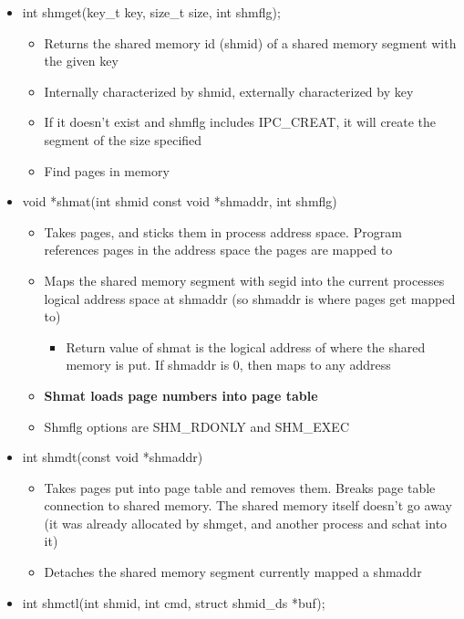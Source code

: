 \begin{itemize}
    \item int shmget(key\_t key, size\_t size, int shmflg);
    \begin{itemize}
        \item Returns the shared memory id (shmid) of a shared memory segment with the given key
        \item Internally characterized by shmid, externally characterized by key
        \item If it doesn't exist and shmflg includes IPC\_CREAT, it will create the segment of the size specified
        \item Find pages in memory
    \end{itemize}
    \item void *shmat(int shmid const void *shmaddr, int shmflg)
    \begin{itemize}
        \item Takes pages, and sticks them in process address space. Program references pages in the address space the pages are mapped to
        \item Maps the shared memory segment with segid into the current processes logical address space at shmaddr (so shmaddr is where pages get mapped to)
        \begin{itemize}
            \item Return value of shmat is the logical address of where the shared memory is put. If shmaddr is 0, then maps to any address
        \end{itemize}
        \item \textbf{Shmat loads page numbers into page table}
        \item Shmflg options are SHM\_RDONLY and SHM\_EXEC
    \end{itemize}
    \item int shmdt(const void *shmaddr)
    \begin{itemize}
        \item Takes pages put into page table and removes them. Breaks page table connection to shared memory. The shared memory itself doesn't go away (it was already allocated by shmget, and another process and schat into it)
        \item Detaches the shared memory segment currently mapped a shmaddr
    \end{itemize}
    \item int shmctl(int shmid, int cmd, struct shmid\_ds *buf);
    \begin{itemize}

\end{itemize}
\end{itemize}
